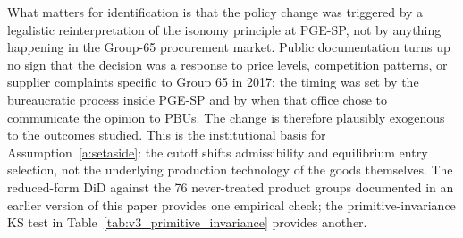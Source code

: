 What matters for identification is that the policy change was triggered by a legalistic reinterpretation of the isonomy principle at PGE-SP, not by anything happening in the Group-65 procurement market. Public documentation turns up no sign that the decision was a response to price levels, competition patterns, or supplier complaints specific to Group 65 in 2017; the timing was set by the bureaucratic process inside PGE-SP and by when that office chose to communicate the opinion to PBUs. The change is therefore plausibly exogenous to the outcomes studied. This is the institutional basis for Assumption~\ref{a:setaside}: the cutoff shifts admissibility and equilibrium entry selection, not the underlying production technology of the goods themselves. The reduced-form DiD against the 76 never-treated product groups documented in an earlier version of this paper provides one empirical check; the primitive-invariance KS test in Table~\ref{tab:v3_primitive_invariance} provides another.
